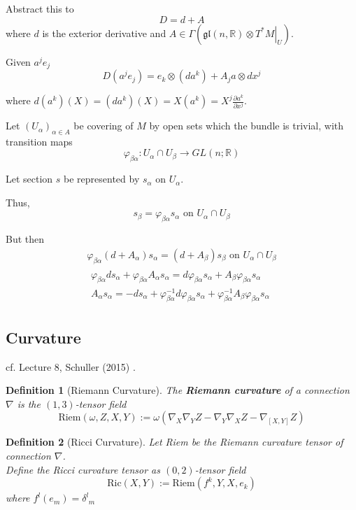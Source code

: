 \documentclass[10pt]{amsart}
\newtheorem{definition}{Definition}
\begin{document}
\begin{multicols*}{2}
Abstract this to
\[
D = d+A
\]
where $d$ is the exterior derivative and $A \in \Gamma( \mathfrak{gl}(n, \mathbb{R}) \otimes \left. T^* M \right|_U)$.

Given $a^j e_j$
\[
D(a^j e_j) = e_k \otimes (da^k) + A_j a \otimes dx^j
\]

where $d(a^k)(X) = (da^k)(X) = X(a^k) = X^j \frac{\partial a^k}{\partial x^j}$. 

Let $(U_{\alpha})_{\alpha \in A}$ be covering of $M$ by open sets which the bundle is trivial, with transition maps
\[
\varphi_{\beta \alpha} : U_{\alpha} \cap U_{\beta} \to GL(n;\mathbb{R})
\]

Let section $s$ be represented by $s_{\alpha}$ on $U_{\alpha}$.

Thus,
\[
s_{\beta} = \varphi_{\beta \alpha} s_{\alpha} \text{ on } U_{\alpha} \cap U_{\beta}
\]

But then
\[
\begin{gathered}
	\varphi_{\beta \alpha} (d+A_{\alpha}) s_{\alpha} = (d+A_{\beta}) s_{\beta} \text{ on } U_{\alpha} \cap U_{\beta} \\
	\begin{gathered}
		\varphi_{\beta \alpha} ds_{\alpha} + \varphi_{\beta \alpha} A_{\alpha} s_{\alpha} = d\varphi_{\beta \alpha} s_{\alpha} + A_{\beta} \varphi_{\beta \alpha} s_{\alpha} \\
		A_{\alpha} s_{\alpha} = -ds_{\alpha} + \varphi^{-1}_{\beta \alpha} d\varphi_{\beta \alpha} s_{\alpha} + \varphi^{-1}_{\beta \alpha} A_{\beta} \varphi_{\beta \alpha} s_{\alpha}
	\end{gathered}
\end{gathered}
\]

\subsection{Curvature}

cf. Lecture 8, Schuller (2015) \cite{Schul2015}.

\begin{definition}[Riemann Curvature]
	The \textbf{Riemann curvature} of a connection $\nabla$ is the $(1,3)$-tensor field
	\begin{equation}
		\text{Riem}(\omega,Z,X,Y) := \omega( \nabla_X \nabla_Y Z - \nabla_Y \nabla_X Z - \nabla_{[X,Y]} Z)
	\end{equation}
\end{definition}

\begin{definition}[Ricci Curvature]
	Let Riem be the Riemann curvature tensor of connection $\nabla$. \\
	Define the Ricci curvature tensor as $(0, 2)$-tensor field
	\begin{equation}
		\text{Ric}(X, Y) := \text{Riem}(f^k, Y, X, e_k)
	\end{equation}
where $f^l(e_m) = \delta^l_{\, \, m}$


\end{definition}
\end{multicols*}
\end{document}
